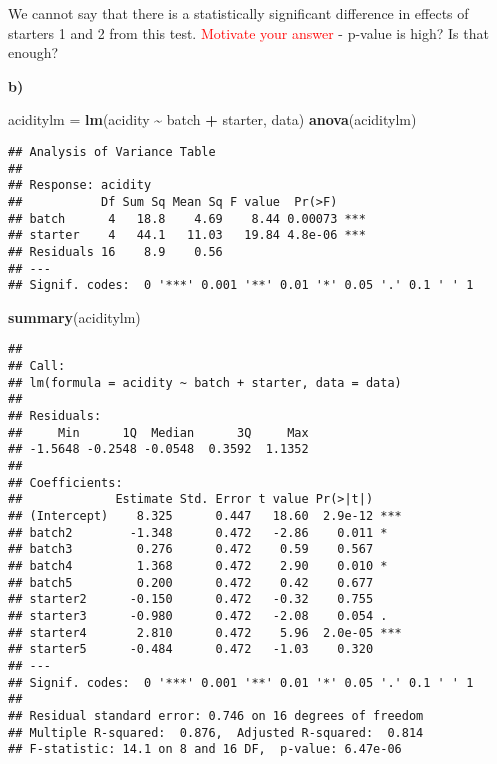 \documentclass[
]{article}
\newenvironment{Shaded}{\begin{snugshade}}{\end{snugshade}}
\newcommand{\FunctionTok}[1]{\textcolor[rgb]{0.13,0.29,0.53}{\textbf{#1}}}
\newcommand{\NormalTok}[1]{#1}
\newcommand{\OtherTok}[1]{\textcolor[rgb]{0.56,0.35,0.01}{#1}}
\newcommand{\SpecialCharTok}[1]{\textcolor[rgb]{0.81,0.36,0.00}{\textbf{#1}}}
\begin{document}
We cannot say that there is a statistically significant difference in
effects of starters 1 and 2 from this test.
\textcolor{red}{Motivate your answer} - p-value is high? Is that enough?

\textbf{b)}

\begin{Shaded}
\begin{Highlighting}[]
\NormalTok{aciditylm }\OtherTok{=} \FunctionTok{lm}\NormalTok{(acidity }\SpecialCharTok{\textasciitilde{}}\NormalTok{ batch }\SpecialCharTok{+}\NormalTok{ starter, data)}
\FunctionTok{anova}\NormalTok{(aciditylm)}
\end{Highlighting}
\end{Shaded}

\begin{verbatim}
## Analysis of Variance Table
## 
## Response: acidity
##           Df Sum Sq Mean Sq F value  Pr(>F)    
## batch      4   18.8    4.69    8.44 0.00073 ***
## starter    4   44.1   11.03   19.84 4.8e-06 ***
## Residuals 16    8.9    0.56                    
## ---
## Signif. codes:  0 '***' 0.001 '**' 0.01 '*' 0.05 '.' 0.1 ' ' 1
\end{verbatim}

\begin{Shaded}
\begin{Highlighting}[]
\FunctionTok{summary}\NormalTok{(aciditylm)}
\end{Highlighting}
\end{Shaded}

\begin{verbatim}
## 
## Call:
## lm(formula = acidity ~ batch + starter, data = data)
## 
## Residuals:
##     Min      1Q  Median      3Q     Max 
## -1.5648 -0.2548 -0.0548  0.3592  1.1352 
## 
## Coefficients:
##             Estimate Std. Error t value Pr(>|t|)    
## (Intercept)    8.325      0.447   18.60  2.9e-12 ***
## batch2        -1.348      0.472   -2.86    0.011 *  
## batch3         0.276      0.472    0.59    0.567    
## batch4         1.368      0.472    2.90    0.010 *  
## batch5         0.200      0.472    0.42    0.677    
## starter2      -0.150      0.472   -0.32    0.755    
## starter3      -0.980      0.472   -2.08    0.054 .  
## starter4       2.810      0.472    5.96  2.0e-05 ***
## starter5      -0.484      0.472   -1.03    0.320    
## ---
## Signif. codes:  0 '***' 0.001 '**' 0.01 '*' 0.05 '.' 0.1 ' ' 1
## 
## Residual standard error: 0.746 on 16 degrees of freedom
## Multiple R-squared:  0.876,  Adjusted R-squared:  0.814 
## F-statistic: 14.1 on 8 and 16 DF,  p-value: 6.47e-06
\end{verbatim}
\end{document}
